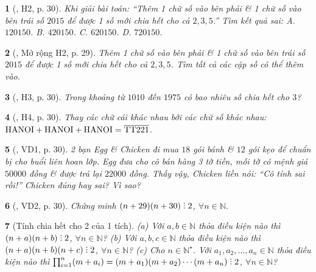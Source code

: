 \documentclass{article}
\newtheorem{baitoan}{}
\DeclareRobustCommand{\divby}{%
	\mathrel{\vbox{\baselineskip.65ex\lineskiplimit0pt\hbox{.}\hbox{.}\hbox{.}}}%
}
\begin{document}
\begin{baitoan}[\cite{Binh_boi_duong_Toan_6_tap_1}, H2, p. 30]
	Khi giải bài toán: ``Thêm 1 chữ số vào bên phải \& 1 chữ số vào bên trái số $2015$ để được 1 số mới chia hết cho cả $2,3,5$.'' Tìm kết quả sai: {\sf A.} $120150$. {\sf B.} $420150$. {\sf C.} $620150$. {\sf D.} $720150$.
\end{baitoan}

\begin{baitoan}[\cite{Binh_boi_duong_Toan_6_tap_1}, Mở rộng H2, p. 29]
	Thêm 1 chữ số vào bên phải \& 1 chữ số vào bên trái số $2015$ để được 1 số mới chia hết cho cả $2,3,5$. Tìm tất cả các cặp số có thể thêm vào.
\end{baitoan}

\begin{baitoan}[\cite{Binh_boi_duong_Toan_6_tap_1}, H3, p. 30]
	Trong khoảng từ $1010$ đến $1975$ có bao nhiêu số chia hết cho $3$?
\end{baitoan}

\begin{baitoan}[\cite{Binh_boi_duong_Toan_6_tap_1}, H4, p. 30]
	Thay các chữ cái khác nhau bởi các chữ số khác nhau: $\rm HANOI + HANOI + HANOI = \overline{TT221}$.
\end{baitoan}

\begin{baitoan}[\cite{Binh_boi_duong_Toan_6_tap_1}, VD1, p. 30]
	2 bạn Egg \& Chicken đi mua $18$ gói bánh \& $12$ gói kẹo để chuẩn bị cho buổi liên hoan lớp. Egg đưa cho cô bán hàng 3 tờ tiền, mỗi tờ có mệnh giá $50000$ đồng \& được trả lại $22000$ đồng. Thấy vậy, Chicken liền nói: ``Cô tính sai rồi!'' Chicken đúng hay sai? Vì sao?
\end{baitoan}

\begin{baitoan}[\cite{Binh_boi_duong_Toan_6_tap_1}, VD2, p. 30]
	Chứng minh $(n + 29)(n + 30)\divby2$, $\forall n\in\mathbb{N}$.
\end{baitoan}

\begin{baitoan}[Tính chia hết cho 2 của 1 tích]
	(a) Với $a,b\in\mathbb{N}$ thỏa điều kiện nào thì $(n + a)(n + b)\divby2$, $\forall n\in\mathbb{N}$? (b) Với $a,b,c\in\mathbb{N}$ thỏa điều kiện nào thì $(n + a)(n + b)(n + c)\divby2$, $\forall n\in\mathbb{N}$? (c) Cho $n\in\mathbb{N}^\star$. Với $a_1,a_2,\ldots,a_n\in\mathbb{N}$ thỏa điều kiện nào thì $\prod_{i=1}^n (m + a_i) = (m + a_1)(m + a_2)\cdots(m + a_n)\divby2$, $\forall n\in\mathbb{N}$?
\end{baitoan}
\end{document}

